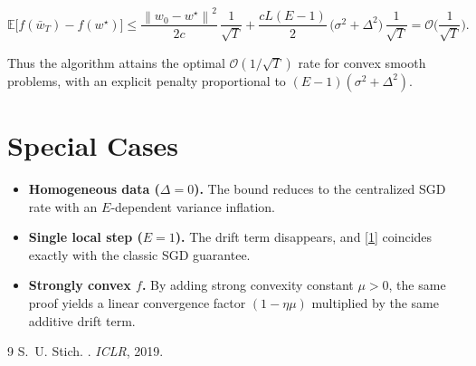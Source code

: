 \documentclass[11pt]{article}
\newcommand{\E}{\mathbb{E}}
\newcommand{\norm}[1]{\left\lVert#1\right\rVert}
\begin{document}
\[
\E\!\big[f(\bar w_T)-f(w^\star)\big]
\le
\frac{\norm{w_0-w^\star}^2}{2c}\,\frac{1}{\sqrt{T}}
+\frac{cL (E-1)}{2}\,\big(\sigma^2+\Delta^2\big)\,\frac{1}{\sqrt{T}}
= \mathcal{O}\!\Big(\frac{1}{\sqrt{T}}\Big).
\]

Thus the algorithm attains the optimal $\mathcal{O}(1/\sqrt{T})$ rate for convex smooth problems, with an explicit penalty proportional to $(E-1)(\sigma^2+\Delta^2)$.

\section*{Special Cases}
\begin{itemize}
\item \textbf{Homogeneous data ($\Delta=0$).} The bound reduces to the centralized SGD rate with an $E$‑dependent variance inflation.
\item \textbf{Single local step ($E=1$).} The drift term disappears, and \eqref{1} coincides exactly with the classic SGD guarantee.
\item \textbf{Strongly convex $f$.} By adding strong convexity constant $\mu>0$, the same proof yields a linear convergence factor $(1-\eta\mu)$ multiplied by the same additive drift term.
\end{itemize}

\begin{thebibliography}{9}
S.~U. Stich.
.
\newblock \emph{ICLR}, 2019.
\end{thebibliography}
\end{document}
